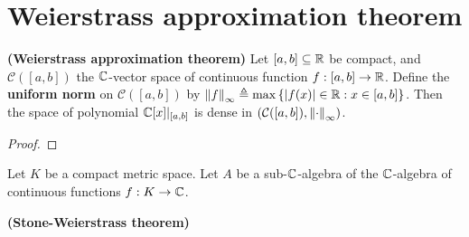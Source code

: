 \documentclass{report}
\begin{document}
\section{Weierstrass approximation theorem} 

\begin{theorem}
\label{THWat}
\textbf{(Weierstrass approximation theorem)} Let $[a,b]\subseteq \mathbb{R}$ be compact, and $\mathcal{C}([a,b])$ the $\mathbb{C}$-vector space of continuous function $f:[a,b]\rightarrow \mathbb{R}$. Define the \textbf{uniform norm} on $\mathcal{C}([a,b])$ by $\left\| f \right\|_{\infty} \triangleq \max \left\{ \left|f(x)\right| \in\mathbb{R}: x \in [a,b] \right\}$. Then the space of polynomial $\mathbb{C}[x]|_{[a,b]}$ is dense in $\left(\mathcal{C}([a,b]), \left\| \cdot \right\|_{\infty} \right)$. 
\end{theorem}
\begin{proof}

\end{proof}


Let $K$ be a compact metric space. Let $A$ be a sub-$\mathbb{C}$-algebra of the $\mathbb{C}$-algebra of continuous functions $f:K\rightarrow \mathbb{C}$. 
\begin{theorem}
\textbf{(Stone-Weierstrass theorem)} 
\end{theorem}
\end{document}
